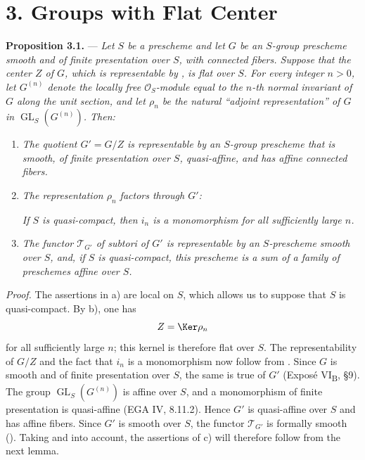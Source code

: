
%
\section*{3. Groups with Flat Center}

\noindent{}%
\textbf{Proposition 3.1.} --- \textit{Let \(S\) be a prescheme and
let \(G\) be an \(S\)-group prescheme smooth and of finite
presentation over \(S\), with connected fibers. Suppose that the
center \(Z\) of \(G\), which is representable by ,
is flat over \(S\). For every integer \(n>0\), let \(G^{(n)}\)
denote the locally free \(\mathcal O_S\)-module equal to the
\(n\)-th normal invariant of \(G\) along the unit section, and let
\(\rho_n\) be the natural ``adjoint representation'' of \(G\) in
\(\operatorname{GL}_S(G^{(n)})\). Then:}

\begin{enumerate}
\renewcommand{\labelenumi}{\textit{\alph{enumi})}}
\item \textit{The quotient \(G'=G/Z\) is representable by an
\(S\)-group prescheme that is smooth, of finite presentation over
\(S\), quasi-affine, and has affine connected fibers.}

\item \textit{The representation \(\rho_n\) factors through \(G'\):}
\begin{center}
  
\end{center}
\textit{If \(S\) is quasi-compact, then \(i_n\) is a monomorphism
for all sufficiently large \(n\).}

\item \textit{The functor \(\mathscr T_{G'}\) of subtori of \(G'\)
is representable by an \(S\)-prescheme smooth over \(S\), and, if
\(S\) is quasi-compact, this prescheme is a sum of a family of
preschemes affine over \(S\).}
\end{enumerate}

\medskip
\noindent\textit{Proof.}
The assertions in a) are local on \(S\), which allows us to suppose
that \(S\) is quasi-compact. By  b), one has
\[
  Z=\Ker\rho_n
\]
for all sufficiently large \(n\); this kernel is therefore flat
over \(S\). The representability of \(G/Z\) and the fact that \(i_n\)
is a monomorphism now follow from . Since \(G\) is smooth and of
finite presentation over \(S\), the same is true of \(G'\)
(Exposé VI\textsubscript{B}, \S9). The group
\(\operatorname{GL}_S(G^{(n)})\) is affine over \(S\), and a
monomorphism of finite presentation is quasi-affine
(EGA IV, 8.11.2). Hence \(G'\) is quasi-affine over \(S\) and has
affine fibers. Since \(G'\) is smooth over \(S\), the functor
\(\mathscr T_{G'}\) is formally smooth ().
Taking  and  into account, the assertions of  c)
will therefore follow from the next lemma.

